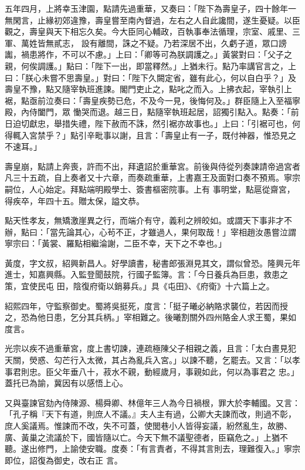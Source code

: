 \begin{pinyinscope}
 五年四月，上將幸玉津園，點請先過重華，又奏曰：「陛下為壽皇子，四十餘年一無閑言，止緣初郊違豫，壽皇嘗至南內督過，左右之人自此讒間，遂生憂疑。以臣觀之，壽皇與天下相忘久矣。今大臣同心輔政，百執事奉法循理，宗室、戚里、三軍、萬姓皆無貳志，
 設有離間，誅之不疑。乃若深居不出，久虧子道，眾口謗讟，禍患將作，不可以不慮。」上曰：「卿等可為朕調護之。」黃裳對曰：「父子之親，何俟調護。」點曰：「陛下一出，即當釋然。」上猶未行。點乃率講官言之，上曰：「朕心未嘗不思壽皇。」對曰：「陛下久闕定省，雖有此心，何以自白乎？」及壽皇不豫，點又隨宰執班進諫。閣門吏止之，點叱之而入。上拂衣起，宰執引上裾，點亟前泣奏曰：「壽皇疾勢已危，不及今一見，後悔何及。」群臣隨上入至福寧殿，內侍闔門，眾
 慟哭而退。越三日，點隨宰執班起居，詔獨引點入。點奏：「前日迫切獻忠，舉措失禮，陛下赦而不誅，然引裾亦故事也。」上曰：「引裾可也，何得輒入宮禁乎？」點引辛毗事以謝，且言：「壽皇止有一子，既付神器，惟恐見之不速耳。」



 壽皇崩，點請上奔喪，許而不出，拜遺詔於重華宮。前後與侍從列奏諫請帝過宮者凡三十五疏，自上奏者又十六章，而奏疏重華，上書嘉王及面對口奏不預焉。寧宗嗣位，人心始定。拜點端明殿學士、簽書樞密院事。上有
 事明堂，點扈從齋宮，得疾卒，年四十五。贈太保，謚文恭。



 點天性孝友，無矯激崖異之行，而端介有守，義利之辨皎如。或謂天下事非才不辦，點曰：「當先論其心，心茍不正，才雖過人，果何取哉！」宰相趙汝愚嘗泣謂寧宗曰：「黃裳、羅點相繼淪謝，二臣不幸，天下之不幸也。」



 黃度，字文叔，紹興新昌人。好學讀書，秘書郎張淵見其文，謂似曾恐。隆興元年進士，知嘉興縣。入監登聞鼓院，行國子監簿。言：「今日養兵為巨患，救患之策，宜使民屯
 田，陰復府衛以銷募兵。」具《屯田》、《府衛》十六篇上之。



 紹熙四年，守監察御史。蜀將吳挺死，度言：「挺子曦必納賂求襲位，若因而授之，恐為他日患，乞分其兵柄。」宰相難之。後曦割關外四州賂金人求王蜀，果如度言。



 光宗以疾不過重華宮，度上書切諫，連疏極陳父子相親之義，且言：「太白晝見犯天關，熒惑、勾芒行入太微，其占為亂兵入宮。」以諫不聽，乞罷去。又言：「以孝事君則忠。臣父年垂八十，菽水不親，動經歲月，事親如此，何以為事君之
 忠。」蓋托已為諭，冀因有以感悟上心。



 又與臺諫官劾內侍陳源、楊舜卿、林億年三人為今日禍根，罪大於李輔國。又言：「孔子稱『天下有道，則庶人不議。』夫人主有過，公卿大夫諫而改，則過不彰，庶人奚議焉。惟諫而不改，失不可蓋，使閭巷小人皆得妄議，紛然亂生，故勝、廣、黃巢之流議於下，國皆隨以亡。今天下無不議聖德者，臣竊危之。」上猶不聽。遂出修門，上諭使安職。度奏：「有言責者，不得其言則去，理難復入。」寧宗即位，詔復為御史，改右正
 言。




\end{pinyinscope}
